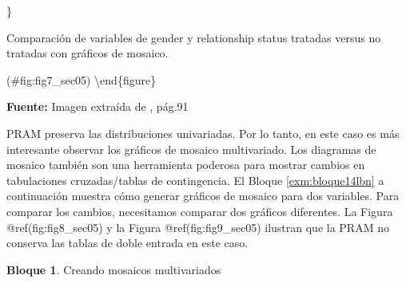 \documentclass[]{book}
\theoremstyle{definition}
\theoremstyle{definition}
\newtheorem{example}{Bloque}[chapter]
\theoremstyle{definition}
\theoremstyle{definition}
\theoremstyle{remark}
\begin{document}
\}

\caption{Comparación de variables de gender y relationship status tratadas versus no tratadas con gráficos de mosaico.}

(\#fig:fig7\_sec05)
\textbackslash{}end\{figure\}

\textbf{Fuente:} Imagen extraída de \citep{benschop2021}, pág.91

PRAM preserva las distribuciones univariadas. Por lo tanto, en este caso es más interesante observar los gráficos de mosaico multivariado. Los diagramas de mosaico también son una herramienta poderosa para mostrar cambios en
tabulaciones cruzadas/tablas de contingencia. El Bloque \ref{exm:bloque14lbn} a continuación muestra cómo generar gráficos de mosaico para dos variables. Para comparar los cambios, necesitamos comparar dos gráficos diferentes. La Figura @ref(fig:fig8\_sec05) y la Figura @ref(fig:fig9\_sec05) ilustran que la PRAM no conserva las tablas
de doble entrada en este caso.

\begin{example}
\protect\hypertarget{exm:bloque14lbn}{}{\label{exm:bloque14lbn} }Creando mosaicos multivariados
\end{example}
\end{document}
